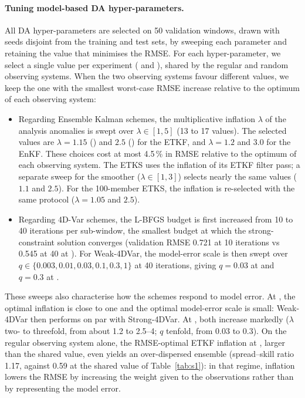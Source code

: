 \paragraph{Tuning model-based DA hyper-parameters.} All DA hyper-parameters are selected on 50 validation windows, drawn with seeds
disjoint from the training and test sets, by sweeping each parameter and
retaining the value that minimises the RMSE. For each hyper-parameter, we select
a single value per experiment (\Sz{} and \So{}), shared by the regular and random
observing systems. When the two observing systems favour different values, we
keep the one with the smallest worst-case RMSE increase relative to the optimum
of each observing system:
\begin{itemize}[leftmargin=*,nosep]
  \item Regarding Ensemble Kalman schemes, the multiplicative inflation $\lambda$ of
    the analysis anomalies is swept over $\lambda \in [1, 5]$ (13 to 17 values).
    The selected values are $\lambda = 1.15$ (\Sz) and $2.5$ (\So) for the ETKF,
    and $\lambda = 1.2$ and $3.0$ for the EnKF. These choices cost at most 4.5\,\%
    in RMSE relative to the optimum of each observing system. The ETKS uses the
    inflation of its ETKF filter pass; a separate sweep for the smoother
    ($\lambda \in [1, 3]$) selects nearly the same values ($1.1$ and $2.5$).
    For the 100-member ETKS, the inflation is re-selected with the same
    protocol ($\lambda = 1.05$ and $2.5$).
  \item  Regarding  4D-Var schemes, the L-BFGS budget is first increased from 10 to
    40 iterations per sub-window, the smallest budget at which the
    strong-constraint solution converges (validation RMSE 0.721 at 10 iterations
    vs 0.545 at 40 at \Sz). For Weak-4DVar, the model-error scale is then swept
    over $q \in \{0.003, 0.01, 0.03, 0.1, 0.3, 1\}$ at 40 iterations, giving
    $q = 0.03$ at \Sz{} and $q = 0.3$ at \So{}.
\end{itemize}
These sweeps also characterise how the schemes respond to model error.
At \Sz{}, the optimal inflation is close to one and the optimal model-error scale
is small: Weak-4DVar then performs on par with Strong-4DVar.
At \So{}, both increase markedly ($\lambda$ two- to threefold, from about 1.2 to 2.5--4;
$q$ tenfold, from 0.03 to 0.3). On the regular observing system alone, the RMSE-optimal ETKF
inflation at \So{}, larger than the shared value, even yields an over-dispersed ensemble
(spread--skill ratio 1.17, against 0.59 at the shared value of Table~\ref{tab:s1}): in that regime, inflation lowers the RMSE by increasing the weight given to
the observations rather than by representing the model error. 


